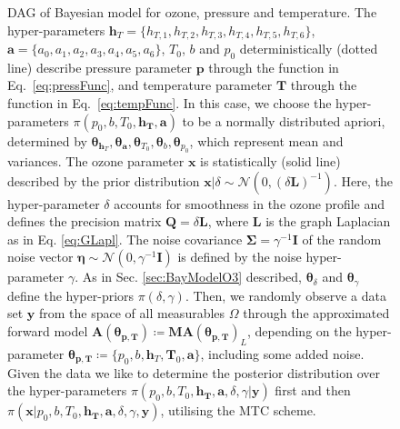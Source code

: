 \begin{figure}[thb!]
	\caption[Directed acyclic graph of Bayesian model for ozone, pressure and temperature.]{DAG of Bayesian model for ozone, pressure and temperature. The hyper-parameters $\bm{h}_T= \{ h_{T,1}, h_{T,2},h_{T,3},h_{T,4},h_{T,5},h_{T,6}\}$, $\bm{a} = \{ a_0, a_1, a_2,a_3,a_4,a_5,a_6\}$, $T_0$, $b$ and $p_0$ deterministically (dotted line) describe pressure parameter $\bm{p}$ through the function in Eq.~\ref{eq:pressFunc}, and temperature parameter $\bm{T}$ through the function in Eq.~\ref{eq:tempFunc}. In this case, we choose the hyper-parameters $\pi(p_0,b,T_0,\bm{h_T},\bm{a})$ to be a normally distributed apriori, determined by $\bm{\theta}_{\bm{h}_T},\bm{\theta}_{\bm{a}}, \bm{\theta}_{T_{0}},\bm{\theta}_{b} , \bm{\theta}_{p_0}$, which represent mean and variances. 
		The ozone parameter $\bm{x}$ is statistically (solid line) described by the prior distribution $\bm{x}| \delta \sim \mathcal{N}(0,(\delta \bm{L})^{-1}) $. 
		Here, the hyper-parameter $\delta$ accounts for smoothness in the ozone profile and defines the precision matrix $\bm{Q} = \delta \bm{L}$, where $\bm{L}$ is the graph Laplacian as in Eq. \ref{eq:GLapl}.
		The noise covariance $\bm{\Sigma} = \gamma^{-1} \bm{I}$ of the random noise vector $\bm{\eta} \sim \mathcal{N}(0,\gamma^{-1} \bm{I} ) $ is defined by the noise hyper-parameter $\gamma$.
		As in Sec. \ref{sec:BayModelO3} described, $\bm{\theta}_{\delta}$ and $\bm{\theta}_{\gamma}$ define the hyper-priors $\pi(\delta, \gamma)$.
		Then, we randomly observe a data set $\bm{y}$ from the space of all measurables $\Omega$ through the approximated forward model $\bm{A}(\bm{\theta}_{\bm{p}, \bm{T}}) \coloneqq \bm{M}\bm{A}(\bm{\theta}_{\bm{p}, \bm{T}})_L$, depending on the hyper-parameter $\bm{\theta}_{\bm{p}, \bm{T}}  \coloneqq \{p_0, b, \bm{h}_T, \bm{T}_0, \bm{a} \}$, including some added noise.
		Given the data we like to determine the posterior distribution over the hyper-parameters $\pi(p_0,b,T_0,\bm{h_T},\bm{a}, \delta, \gamma | \bm{y})$ first and then $\pi(\bm{x}|p_0,b,T_0,\bm{h_T},\bm{a}, \delta, \gamma, \bm{y})$, utilising the MTC scheme.}
	\label{fig:DAGComplete}
\end{figure}
